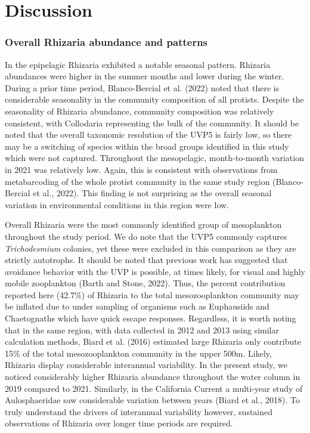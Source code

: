 \documentclass[
]{article}
\begin{document}
\section{Discussion}\label{discussion}

\subsubsection{Overall Rhizaria abundance and
patterns}\label{overall-rhizaria-abundance-and-patterns}

In the epipelagic Rhizaria exhibited a notable seasonal pattern.
Rhizaria abundances were higher in the summer months and lower during
the winter. During a prior time period, Blanco-Bercial et al. (2022)
noted that there is considerable seasonality in the community
composition of all protists. Despite the seasonality of Rhizaria
abundance, community composition was relatively consistent, with
Collodaria representing the bulk of the community. It should be noted
that the overall taxonomic resolution of the UVP5 is fairly low, so
there may be a switching of species within the broad groups identified
in this study which were not captured. Throughout the mesopelagic,
month-to-month variation in 2021 was relatively low. Again, this is
consistent with observations from metabarcoding of the whole protist
community in the same study region (Blanco-Bercial et al., 2022). This
finding is not surprising as the overall seasonal variation in
environmental conditions in this region were low.

Overall Rhizaria were the most commonly identified group of mesoplankton
throughout the study period. We do note that the UVP5 commonly captures
\emph{Trichodesmium} colonies, yet these were excluded in this
comparison as they are strictly autotrophs. It should be noted that
previous work has suggested that avoidance behavior with the UVP is
possible, at times likely, for visual and highly mobile zooplankton
(Barth and Stone, 2022). Thus, the percent contribution reported here
(42.7\%) of Rhizaria to the total mesozooplankton community may be
inflated due to under sampling of organisms such as Euphausiids and
Chaetognaths which have quick escape responses. Regardless, it is worth
noting that in the same region, with data collected in 2012 and 2013
using similar calculation methods, Biard et al. (2016) estimated large
Rhizaria only contribute 15\% of the total mesozooplankton community in
the upper 500m. Likely, Rhizaria display considerable interannual
variability. In the present study, we noticed considerably higher
Rhizaria abundance throughout the water column in 2019 compared to 2021.
Similarly, in the California Current a multi-year study of
Aulosphaeridae saw considerable variation between years (Biard et al.,
2018). To truly understand the drivers of interannual variability
however, sustained observations of Rhizaria over longer time periods are
required.
\end{document}
